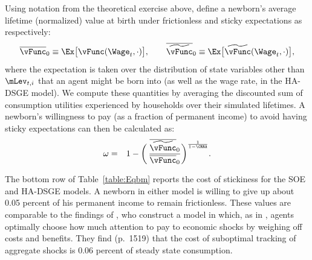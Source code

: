 \documentclass[titlepage]{\econtex}\newcommand{\texname}{cAndCwithStickyE}
\begin{document}
Using notation from the theoretical exercise above, define a newborn's average lifetime (normalized) value at birth under frictionless and sticky expectations as respectively:
\begin{equation*}
\overline{\vFunc}_0 \equiv \Ex \big[ \vFunc(\Wage_t,\cdot)\big], \qquad \overline{\perc{\vFunc}}_0 \equiv \Ex \big[ \perc{\vFunc}(\Wage_t,\cdot)\big],
\end{equation*}
where the expectation is taken over the distribution of state variables other than $\mLev_{t,i}$ that an agent might be born into (as well as the wage rate, in the HA-DSGE model).  We compute these quantities by averaging the discounted sum of consumption utilities experienced by households over their simulated lifetimes.  A newborn's willingness to pay (as a fraction of permanent income) to avoid having sticky expectations can then be calculated as:
\begin{eqnarray}\label{eq:WTP}
\omega & = & 1 - \bigg(\,\frac{\overline{\perc{\vFunc}}_0}{\overline{\vFunc}_0} \bigg)^{\frac{1}{1-\CRRA}}.
\end{eqnarray}

The bottom row of Table~\ref{table:Eqbm} reports the cost of stickiness for the SOE and HA-DSGE models.  A newborn in either model is willing to give up about 0.05 percent of his permanent income to remain frictionless.  These values are comparable to the findings of \cite{mackWiedREStud15}, who construct a model in which, as in \cite{reis:inattentive}, agents optimally choose how much attention to pay to economic shocks by weighing off costs and benefits.  They find (p.\ 1519) that the cost of suboptimal tracking of aggregate shocks is 0.06 percent of steady state consumption. 
\end{document}
